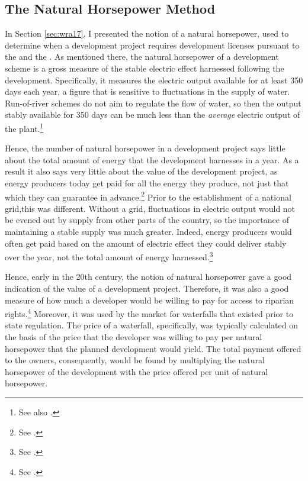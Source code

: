 \subsection{The Natural Horsepower Method}\label{sec:nathp}

In Section \ref{sec:wra17}, I presented the notion of a natural horsepower, used to determine when a development project requires development licenses pursuant to the \cite{wra17} and the \cite{ica17}. As mentioned there, the natural horsepower of a development scheme is a gross measure of the stable electric effect harnessed following the development. Specifically, it measures the electric output available for at least 350 days each year, a figure that is sensitive to fluctuations in the supply of water. Run-of-river schemes do not aim to regulate the flow of water, so then the output stably available for 350 days can be much less than the {\it average} electric output of the plant.\footnote{See also \cite{sofienlund07}.}

Hence, the number of natural horsepower in a development project says little about the total amount of energy that the development harnesses in a year. As a result it also says very little about the value of the development project, as energy producers today get paid for all the energy they produce, not just that which they can guarantee in advance.\footnote{See \cite[83-84]{uleberg08}.} Prior to the establishment of a national grid,this was different. Without a grid, fluctuations in electric output would not be evened out by supply from other parts of the country, so the importance of maintaining a stable supply was much greater. Indeed, energy producers would often get paid based on the amount of electric effect they could deliver stably over the year, not the total amount of energy harnessed.\footnote{See \cite[83]{uleberg08}.}

Hence, early in the 20th century, the notion of natural horsepower gave a good indication of the value of a development project. Therefore, it was also a good measure of how much a developer would be willing to pay for access to riparian rights.\footnote{See \cite[83]{uleberg08}.} Moreover, it was used by the market for waterfalls that existed prior to state regulation. The price of a waterfall, specifically, was typically calculated on the basis of the price that the developer was willing to pay per natural horsepower that the planned development would yield. The total payment offered to the owners, consequently, would be found by multiplying the natural horsepower of the development with the price offered per unit of natural horsepower.

